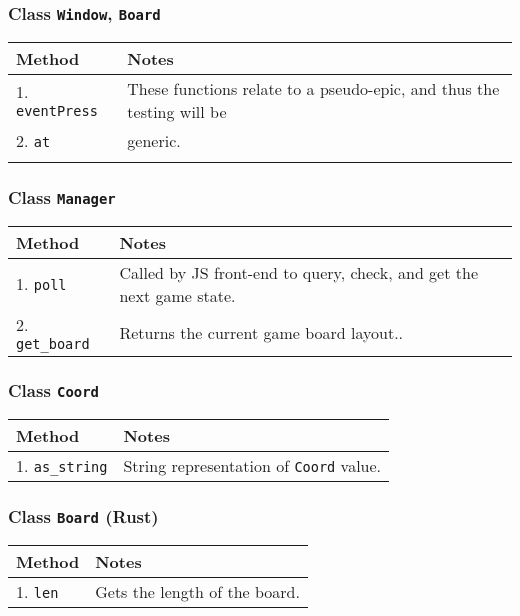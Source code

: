 \documentclass[11pt]{article}
\begin{document}
\subsubsection{Class \texttt{Window}, \texttt{Board}}
\label{sec:org157483c}
\begin{center}
\begin{tabular}{|l|l|}
Method & Notes\\
\hline
1. \texttt{eventPress} & These functions relate to a pseudo-epic, and thus the testing will be\\
2. \texttt{at} & generic.\\
 & \\
\end{tabular}
\end{center}
\subsubsection{Class \texttt{Manager}}
\label{sec:org8882195}
\begin{center}
\begin{tabular}{|l|l|}
Method & Notes\\
\hline
1. \texttt{poll} & Called by JS front-end to query, check, and get the next game state.\\
2. \texttt{get\_board} & Returns the current game board layout..\\
\end{tabular}
\end{center}
\subsubsection{Class \texttt{Coord}}
\label{sec:org5019437}
\begin{center}
\begin{tabular}{|l|l|}
Method & Notes\\
\hline
1. \texttt{as\_string} & String representation of \texttt{Coord} value.\\
\end{tabular}
\end{center}
\subsubsection{Class \texttt{Board} (Rust)}
\label{sec:orgecdab17}
\begin{center}
\begin{tabular}{|l|l|}
Method & Notes\\
\hline
1. \texttt{len} & Gets the length of the board.\\
\end{tabular}
\end{center}
\end{document}
